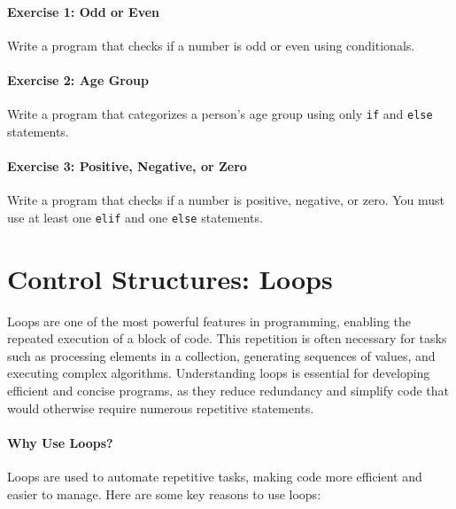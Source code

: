 \documentclass[
  letterpaper,
  DIV=11,
  numbers=noendperiod]{scrreprt}
\begin{document}
\hypertarget{exercise-1-odd-or-even}{%
\subsubsection{Exercise 1: Odd or Even}\label{exercise-1-odd-or-even}}

Write a program that checks if a number is odd or even using
conditionals.

\hypertarget{exercise-2-age-group}{%
\subsubsection{Exercise 2: Age Group}\label{exercise-2-age-group}}

Write a program that categorizes a person's age group using only
\texttt{if} and \texttt{else} statements.

\hypertarget{exercise-3-positive-negative-or-zero}{%
\subsubsection{Exercise 3: Positive, Negative, or
Zero}\label{exercise-3-positive-negative-or-zero}}

Write a program that checks if a number is positive, negative, or zero.
You must use at least one \texttt{elif} and one \texttt{else}
statements.


\hypertarget{control-structures-loops}{%
\chapter{Control Structures: Loops}\label{control-structures-loops}}

Loops are one of the most powerful features in programming, enabling the
repeated execution of a block of code. This repetition is often
necessary for tasks such as processing elements in a collection,
generating sequences of values, and executing complex algorithms.
Understanding loops is essential for developing efficient and concise
programs, as they reduce redundancy and simplify code that would
otherwise require numerous repetitive statements.

\hypertarget{why-use-loops}{%
\subsubsection{Why Use Loops?}\label{why-use-loops}}

Loops are used to automate repetitive tasks, making code more efficient
and easier to manage. Here are some key reasons to use loops:
\end{document}
